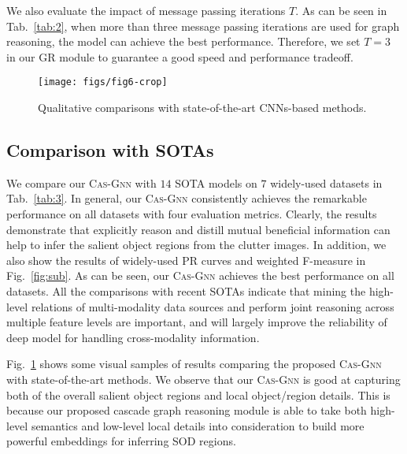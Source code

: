 \documentclass[runningheads]{llncs}
\begin{document}
 We also evaluate the impact of message passing iterations $T$. As can be seen in Tab.~\ref{tab:2}, when more than three message passing iterations are used for graph reasoning, the model can achieve the best performance. Therefore, we set $T=3$ in our GR module to guarantee a good speed and performance tradeoff.  

\begin{figure}[pt]
	\begin{center}
		\texttt{[image: figs/fig6-crop]}
	\end{center}
	\caption{Qualitative comparisons with state-of-the-art CNNs-based methods.}
	\label{fig:6}
\end{figure}

\subsection{Comparison with SOTAs}

 We compare our {\scshape{Cas-Gnn}} with $14$ SOTA models on $7$ widely-used datasets in Tab.~\ref{tab:3}. In general, our {\scshape{Cas-Gnn}} consistently achieves the remarkable performance on all datasets with four evaluation metrics. Clearly, the results demonstrate that explicitly reason and distill mutual beneficial information can help to infer the salient object regions from the clutter images. In addition, we also show the results of widely-used PR curves and weighted F-measure in Fig.~\ref{fig:sub}. As can be seen, our {\scshape{Cas-Gnn}} achieves the best performance on all datasets. All the comparisons with recent SOTAs indicate that mining the high-level relations of multi-modality data sources and perform joint reasoning across multiple feature levels are important, and will largely improve the reliability of deep model for handling cross-modality information. 

 Fig.~\ref{fig:6} shows some visual samples of results comparing the proposed {\scshape{Cas-Gnn}}  with state-of-the-art methods. We observe that our {\scshape{Cas-Gnn}} is good at capturing both of the overall salient object regions and local object/region details. This is because our proposed cascade graph reasoning module is able to take both high-level semantics and low-level local details into consideration to build more powerful embeddings for inferring SOD regions.
\end{document}
